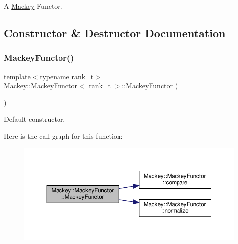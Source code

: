 A \hyperlink{namespaceMackey}{Mackey} Functor. 

\subsection{Constructor \& Destructor Documentation}
\mbox{\label{classMackey_1_1MackeyFunctor_a075cd364217700d5f5c2459d4a988a93}} 
\subsubsection{\texorpdfstring{Mackey\+Functor()}{MackeyFunctor()}\hspace{0.1cm}{\footnotesize\ttfamily [1/2]}}
{\footnotesize\ttfamily template$<$typename rank\+\_\+t$>$ \\
\hyperlink{classMackey_1_1MackeyFunctor}{Mackey\+::\+Mackey\+Functor}$<$ rank\+\_\+t $>$\+::\hyperlink{classMackey_1_1MackeyFunctor}{Mackey\+Functor} (\begin{DoxyParamCaption}{ }\end{DoxyParamCaption})\hspace{0.3cm}{\ttfamily [inline]}}



Default constructor. 

Here is the call graph for this function\+:\nopagebreak
\begin{figure}[H]
\begin{center}
\leavevmode
\includegraphics[width=350pt]{classMackey_1_1MackeyFunctor_a075cd364217700d5f5c2459d4a988a93_cgraph}
\end{center}
\end{figure}
\mbox{\label{classMackey_1_1MackeyFunctor_a7cdc1be794a7b39e7d4b86c2ad26355e}} 
